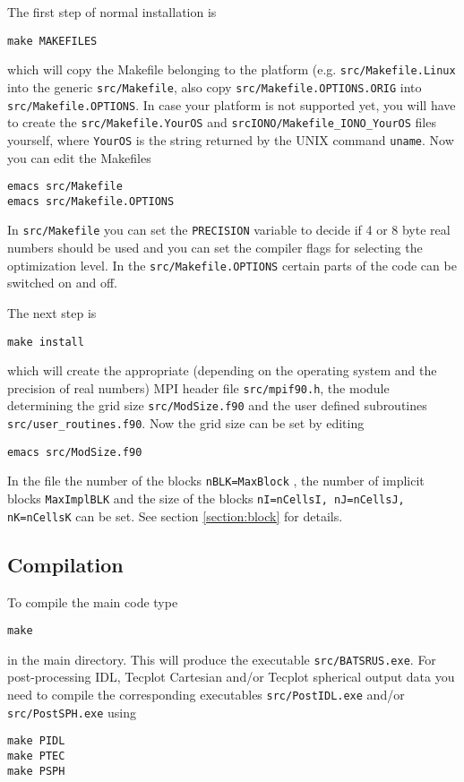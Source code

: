 The first step of normal installation is
\begin{verbatim}
make MAKEFILES
\end{verbatim}
which will copy the Makefile belonging to the platform 
(e.g. {\tt src/Makefile.Linux} into the generic {\tt src/Makefile},
also copy {\tt src/Makefile.OPTIONS.ORIG} into {\tt src/Makefile.OPTIONS}.
In case your platform is not supported yet, you will have to create the
{\tt src/Makefile.YourOS} and 
{\tt srcIONO/Makefile\_IONO\_YourOS} files yourself,
where {\tt YourOS} is the string returned by the
UNIX command {\tt uname}.
Now you can edit the Makefiles
\begin{verbatim}
emacs src/Makefile
emacs src/Makefile.OPTIONS
\end{verbatim}
In {\tt src/Makefile} you can set the {\tt PRECISION} variable to decide
if 4 or 8 byte real numbers should be used and you can set the compiler flags
for selecting the optimization level. 
In the {\tt src/Makefile.OPTIONS} certain parts of the code
can be switched on and off.

The next step is
\begin{verbatim}
make install
\end{verbatim}
which will create the appropriate (depending on the 
operating system and the precision of real numbers) MPI header file 
{\tt src/mpif90.h}, the module determining the grid size 
{\tt src/ModSize.f90} and the user defined subroutines 
{\tt src/user\_routines.f90}. Now the grid size can be set by editing
\begin{verbatim}
emacs src/ModSize.f90
\end{verbatim}
In the file the number of the blocks {\tt nBLK=MaxBlock}
, the number of implicit blocks {\tt MaxImplBLK}             %
and the size of the blocks {\tt nI=nCellsI, nJ=nCellsJ, nK=nCellsK}
can be set. See section \ref{section:block} for details.

\subsection{Compilation}

To compile the main code type
\begin{verbatim}
make
\end{verbatim}
in the main directory. This will produce the executable 
{\tt src/BATSRUS.exe}. For post-processing IDL,
Tecplot Cartesian and/or Tecplot spherical output data 
you need to compile the corresponding executables {\tt src/PostIDL.exe}
and/or {\tt src/PostSPH.exe} using
\begin{verbatim}
make PIDL
make PTEC
make PSPH
\end{verbatim}

